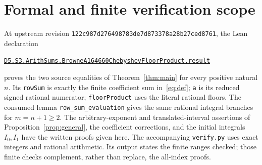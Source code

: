 \documentclass[11pt]{article}
\begin{document}
\section{Formal and finite verification scope}\label{sec:scope}
At upstream revision
\texttt{122c987d276498783de7d873378a28b27ced8761}, the Lean declaration
\begin{center}\small
\href{https://github.com/the-omega-institute/trureturing/blob/122c987d276498783de7d873378a28b27ced8761/D5/S3/ArithSums/BrowneA164660ChebyshevFloorProduct.lean}
{\nolinkurl{D5.S3.ArithSums.BrowneA164660ChebyshevFloorProduct.result}}
\end{center}
proves the two source equalities of Theorem~\ref{thm:main} for every
positive natural $n$.
Its \texttt{rowSum} is exactly the finite coefficient sum
in~\eqref{eq:def}; \texttt{a} is its reduced signed rational numerator;
\texttt{floorProduct} uses the literal rational floors.
The consumed lemma \texttt{row\_sum\_evaluation} gives the same
rational integral branches for $m=n+1\ge2$.
The arbitrary-exponent and translated-interval assertions of
Proposition~\ref{prop:general}, the coefficient corrections, and the
initial integrals $I_0,I_1$ have the written proofs given here.
The accompanying \texttt{verify.py} uses exact integers and rational
arithmetic. Its output states the finite ranges checked; those finite
checks complement, rather than replace, the all-index proofs.
\end{document}
